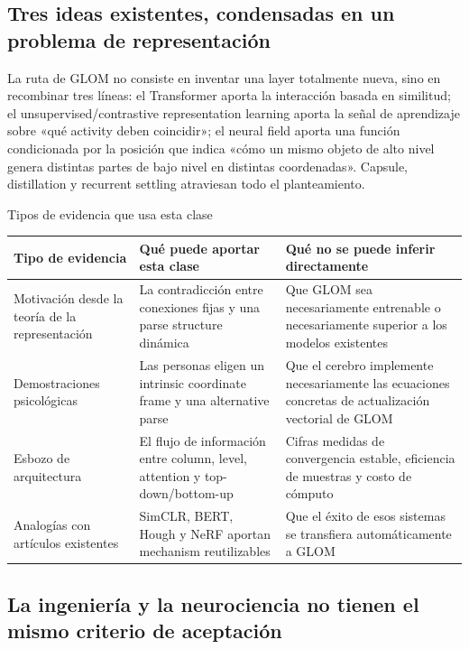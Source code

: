 \subsection{Tres ideas existentes, condensadas en un problema de representación}

La ruta de GLOM no consiste en inventar una layer totalmente nueva, sino en recombinar tres líneas: el Transformer aporta la interacción basada en similitud; el unsupervised/contrastive representation learning aporta la señal de aprendizaje sobre «qué activity deben coincidir»; el neural field aporta una función condicionada por la posición que indica «cómo un mismo objeto de alto nivel genera distintas partes de bajo nivel en distintas coordenadas». Capsule, distillation y recurrent settling atraviesan todo el planteamiento.


\begin{knowledgebox}{Tipos de evidencia que usa esta clase}
\begin{tabularx}{\textwidth}{L{0.22\textwidth}L{0.31\textwidth}>{\raggedright\arraybackslash}X}
\toprule
Tipo de evidencia & Qué puede aportar esta clase & Qué no se puede inferir directamente \\
\midrule
Motivación desde la teoría de la representación & La contradicción entre conexiones fijas y una parse structure dinámica & Que GLOM sea necesariamente entrenable o necesariamente superior a los modelos existentes \\
Demostraciones psicológicas & Las personas eligen un intrinsic coordinate frame y una alternative parse & Que el cerebro implemente necesariamente las ecuaciones concretas de actualización vectorial de GLOM \\
Esbozo de arquitectura & El flujo de información entre column, level, attention y top-down/bottom-up & Cifras medidas de convergencia estable, eficiencia de muestras y costo de cómputo \\
Analogías con artículos existentes & SimCLR, BERT, Hough y NeRF aportan mechanism reutilizables & Que el éxito de esos sistemas se transfiera automáticamente a GLOM \\
\bottomrule
\end{tabularx}
\end{knowledgebox}

\subsection{La ingeniería y la neurociencia no tienen el mismo criterio de aceptación}

